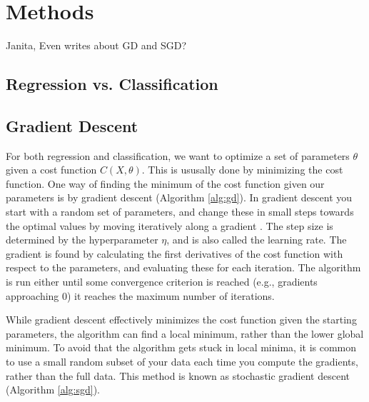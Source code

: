 \section{Methods}\label{sec:methods}
Janita, Even writes about GD and SGD?
\subsection{Regression vs. Classification}\label{ssec:regression_classification}


\subsection{Gradient Descent}\label{ssec:gradient_descent}

For both regression and classification, we want to optimize a set of parameters $\theta$ given a cost function $C(X, \theta)$. This is ususally done by minimizing the cost function. One way of finding the minimum of the cost function given our parameters is by gradient descent (Algorithm \ref{alg:gd}). In gradient descent you start with a random set of parameters, and change these in small steps towards the optimal values by moving iteratively along a gradient \cite{Goodfellow:2016:deep_learning}. The step size is determined by the hyperparameter $\eta$, and is also called the learning rate. The gradient is found by calculating the first derivatives of the cost function with respect to the parameters, and evaluating these for each iteration. The algorithm is run either until some convergence criterion is reached (e.g., gradients approaching 0) it reaches the maximum number of iterations.

While gradient descent effectively minimizes the cost function given the starting parameters, the algorithm can find a local minimum, rather than the lower global minimum. To avoid that the algorithm gets stuck in local minima, it is common to use a small random subset of your data each time you compute the gradients, rather than the full data. This method is known as stochastic gradient descent (Algorithm \ref{alg:sgd}).

